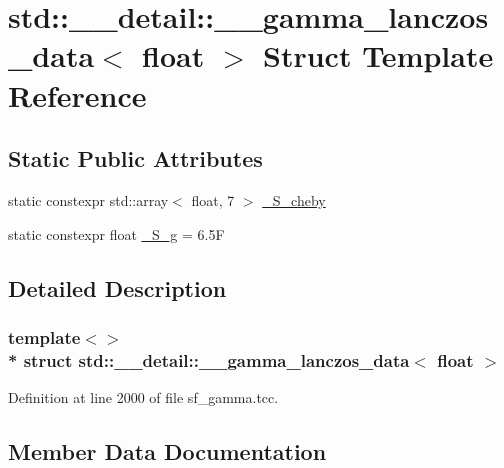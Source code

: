 \hypertarget{structstd_1_1____detail_1_1____gamma__lanczos__data_3_01float_01_4}{}\section{std\+:\+:\+\_\+\+\_\+detail\+:\+:\+\_\+\+\_\+gamma\+\_\+lanczos\+\_\+data$<$ float $>$ Struct Template Reference}
\label{structstd_1_1____detail_1_1____gamma__lanczos__data_3_01float_01_4}
\subsection*{Static Public Attributes}
\begin{DoxyCompactItemize}
\item 
static constexpr std\+::array$<$ float, 7 $>$ \hyperlink{structstd_1_1____detail_1_1____gamma__lanczos__data_3_01float_01_4_a2c49be7a79e21754e583099068cc1c3a}{\+\_\+\+S\+\_\+cheby}
\item 
static constexpr float \hyperlink{structstd_1_1____detail_1_1____gamma__lanczos__data_3_01float_01_4_aadc6da66fb542d6b88ddf3a0aef6249c}{\+\_\+\+S\+\_\+g} = 6.\+5F
\end{DoxyCompactItemize}


\subsection{Detailed Description}
\subsubsection*{template$<$$>$\\*
struct std\+::\+\_\+\+\_\+detail\+::\+\_\+\+\_\+gamma\+\_\+lanczos\+\_\+data$<$ float $>$}



Definition at line 2000 of file sf\+\_\+gamma.\+tcc.



\subsection{Member Data Documentation}
